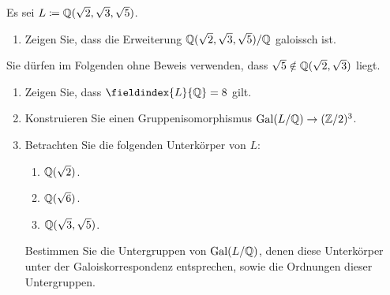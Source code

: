 \documentclass[a4paper, 10pt]{scrartcl}
\begin{document}
\begin{question}
  Es sei $L \coloneqq \mathbb{Q}(\sqrt{2}, \sqrt{3}, \sqrt{5})$.
  \begin{enumerate}
    \item
      Zeigen Sie, dass die Erweiterung $\mathbb{Q}(\sqrt{2}, \sqrt{3}, \sqrt{5})/\mathbb{Q}$ galoissch ist.
  \end{enumerate}
  Sie dürfen im Folgenden ohne Beweis verwenden, dass $\sqrt{5} \notin \mathbb{Q}(\sqrt{2}, \sqrt{3})$ liegt.
  \begin{enumerate}
    \item
      Zeigen Sie, dass $\fieldindex{L}{\Rational} = 8$ gilt.
    \item
      Konstruieren Sie einen Gruppenisomorphismus $\operatorname{Gal}(L/\mathbb{Q}) \to (\mathbb{Z}/2)^3$.
    \item
      Betrachten Sie die folgenden Unterkörper von $L$:
      \begin{enumerate}
        \item
          $\mathbb{Q}(\sqrt{2})$.
        \item
          $\mathbb{Q}(\sqrt{6})$.
        \item
          $\mathbb{Q}(\sqrt{3}, \sqrt{5})$.
      \end{enumerate}
      Bestimmen Sie die Untergruppen von $\operatorname{Gal}(L/\mathbb{Q})$, denen diese Unterkörper unter der Galoiskorrespondenz entsprechen, sowie die Ordnungen dieser Untergruppen.
  \end{enumerate}
\end{question}
\end{document}
